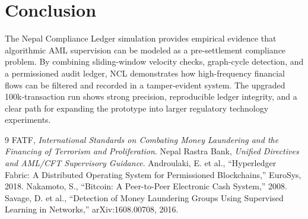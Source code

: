 \documentclass[11pt, letterpaper]{article}
\begin{document}
\section{Conclusion}
The Nepal Compliance Ledger simulation provides empirical evidence that algorithmic AML supervision can be modeled as a pre-settlement compliance problem. By combining sliding-window velocity checks, graph-cycle detection, and a permissioned audit ledger, NCL demonstrates how high-frequency financial flows can be filtered and recorded in a tamper-evident system. The upgraded 100k-transaction run shows strong precision, reproducible ledger integrity, and a clear path for expanding the prototype into larger regulatory technology experiments.

\begin{thebibliography}{9}
 FATF, \textit{International Standards on Combating Money Laundering and the Financing of Terrorism and Proliferation}.
 Nepal Rastra Bank, \textit{Unified Directives and AML/CFT Supervisory Guidance}.
 Androulaki, E. et al., ``Hyperledger Fabric: A Distributed Operating System for Permissioned Blockchains,'' EuroSys, 2018.
 Nakamoto, S., ``Bitcoin: A Peer-to-Peer Electronic Cash System,'' 2008.
 Savage, D. et al., ``Detection of Money Laundering Groups Using Supervised Learning in Networks,'' arXiv:1608.00708, 2016.
\end{thebibliography}
\end{document}
